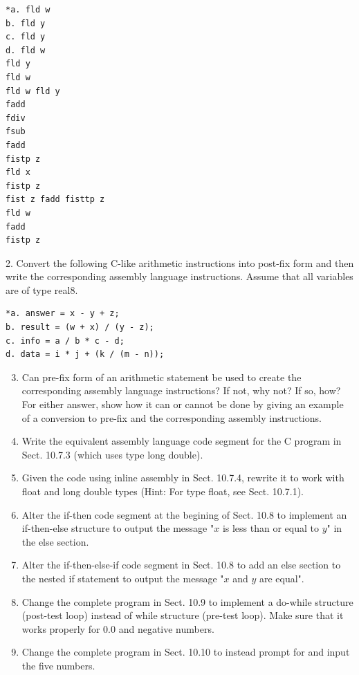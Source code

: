\documentclass[10pt]{book}
\begin{document}
\begin{verbatim}
*a. fld w
b. fld y
c. fld y
d. fld w
fld y
fld w
fld w fld y
fadd
fdiv
fsub
fadd
fistp z
fld x
fistp z
fist z fadd fisttp z
fld w
fadd
fistp z
\end{verbatim}

2. Convert the following C-like arithmetic instructions into post-fix form and then write the corresponding assembly language instructions. Assume that all variables are of type real8.

\begin{verbatim}
*a. answer = x - y + z;
b. result = (w + x) / (y - z);
c. info = a / b * c - d;
d. data = i * j + (k / (m - n));
\end{verbatim}

\begin{enumerate}
  \setcounter{enumi}{2}
  \item Can pre-fix form of an arithmetic statement be used to create the corresponding assembly language instructions? If not, why not? If so, how? For either answer, show how it can or cannot be done by giving an example of a conversion to pre-fix and the corresponding assembly instructions.
  \item Write the equivalent assembly language code segment for the C program in Sect. 10.7.3 (which uses type long double).
  \item Given the code using inline assembly in Sect. 10.7.4, rewrite it to work with float and long double types (Hint: For type float, see Sect. 10.7.1).
  \item Alter the if-then code segment at the begining of Sect. 10.8 to implement an if-then-else structure to output the message "$x$ is less than or equal to $y$" in the else section.
  \item Alter the if-then-else-if code segment in Sect. 10.8 to add an else section to the nested if statement to output the message "$x$ and $y$ are equal".
  \item Change the complete program in Sect. 10.9 to implement a do-while structure (post-test loop) instead of while structure (pre-test loop). Make sure that it works properly for 0.0 and negative numbers.
  \item Change the complete program in Sect. 10.10 to instead prompt for and input the five numbers.
\end{enumerate}
\end{document}
